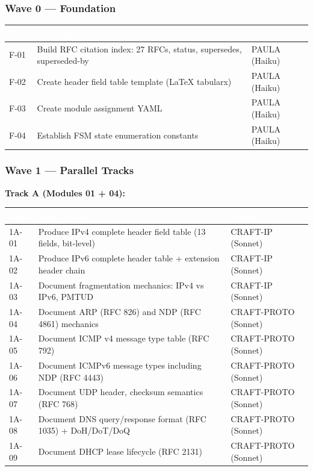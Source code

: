 \documentclass[11pt,letterpaper]{article}
\newcommand{\tableheader}[1]{\textbf{\sffamily\textcolor{white}{#1}}}
\begin{document}
\subsubsection{Wave 0 --- Foundation}

\begin{center}
\begin{tabularx}{\textwidth}{L{3cm}XC{1.8cm}}
\toprule
{}
\tableheader{Task} & \tableheader{Description} & \tableheader{Owner} \\
\midrule
F-01 & Build RFC citation index: 27 RFCs, status, supersedes, superseded-by & PAULA (Haiku) \\
F-02 & Create header field table template (LaTeX tabularx) & PAULA (Haiku) \\
F-03 & Create module assignment YAML & PAULA (Haiku) \\
F-04 & Establish FSM state enumeration constants & PAULA (Haiku) \\
\bottomrule
\end{tabularx}
\end{center}

\subsubsection{Wave 1 --- Parallel Tracks}

\textbf{Track A (Modules 01 + 04):}

\begin{center}
\begin{tabularx}{\textwidth}{L{2.5cm}XC{2cm}}
\toprule
{}
\tableheader{Task} & \tableheader{Description} & \tableheader{Owner} \\
\midrule
1A-01 & Produce IPv4 complete header field table (13 fields, bit-level) & CRAFT-IP (Sonnet) \\
1A-02 & Produce IPv6 complete header table + extension header chain & CRAFT-IP (Sonnet) \\
1A-03 & Document fragmentation mechanics: IPv4 vs IPv6, PMTUD & CRAFT-IP (Sonnet) \\
1A-04 & Document ARP (RFC 826) and NDP (RFC 4861) mechanics & CRAFT-PROTO (Sonnet) \\
1A-05 & Document ICMP v4 message type table (RFC 792) & CRAFT-PROTO (Sonnet) \\
1A-06 & Document ICMPv6 message types including NDP (RFC 4443) & CRAFT-PROTO (Sonnet) \\
1A-07 & Document UDP header, checksum semantics (RFC 768) & CRAFT-PROTO (Sonnet) \\
1A-08 & Document DNS query/response format (RFC 1035) + DoH/DoT/DoQ & CRAFT-PROTO (Sonnet) \\
1A-09 & Document DHCP lease lifecycle (RFC 2131) & CRAFT-PROTO (Sonnet) \\
\bottomrule
\end{tabularx}
\end{center}
\end{document}
